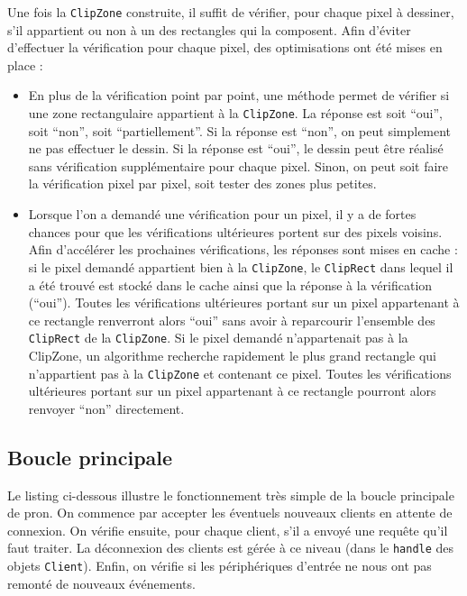 Une fois la \verb|ClipZone| construite, il suffit de vérifier, pour chaque pixel à dessiner, s'il appartient ou non à un des rectangles qui la composent. Afin d'éviter d'effectuer la vérification pour chaque pixel, des optimisations ont été mises en place :
\begin{itemize}
  \item En plus de la vérification point par point, une méthode permet de vérifier si une zone rectangulaire appartient à la \verb|ClipZone|. La réponse est soit ``oui'', soit ``non'', soit ``partiellement''. Si la réponse est ``non'', on peut simplement ne pas effectuer le dessin. Si la réponse est ``oui'', le dessin peut être réalisé sans vérification supplémentaire pour chaque pixel. Sinon, on peut soit faire la vérification pixel par pixel, soit tester des zones plus petites.
  \item Lorsque l'on a demandé une vérification pour un pixel, il y a de fortes chances pour que les vérifications ultérieures portent sur des pixels voisins. Afin d'accélérer les prochaines vérifications, les réponses sont mises en cache : si le pixel demandé appartient bien à la \verb|ClipZone|, le \verb|ClipRect| dans lequel il a été trouvé est stocké dans le cache ainsi que la réponse à la vérification (``oui''). Toutes les vérifications ultérieures portant sur un pixel appartenant à ce rectangle renverront alors ``oui'' sans avoir à reparcourir l'ensemble des \verb|ClipRect| de la \verb|ClipZone|. Si le pixel demandé n'appartenait pas à la ClipZone, un algorithme recherche rapidement le plus grand rectangle qui n'appartient pas à la \verb|ClipZone| et contenant ce pixel. Toutes les vérifications ultérieures portant sur un pixel appartenant à ce rectangle pourront alors renvoyer ``non'' directement.
\end{itemize}

\subsection{Boucle principale}

Le listing ci-dessous illustre le fonctionnement très simple de la boucle principale de pron. On commence par accepter les éventuels nouveaux clients en attente de connexion. On vérifie ensuite, pour chaque client, s'il a envoyé une requête qu'il faut traiter. La déconnexion des clients est gérée à ce niveau (dans le \verb|handle| des objets \verb|Client|). Enfin, on vérifie si les périphériques d'entrée ne nous ont pas remonté de nouveaux événements.

